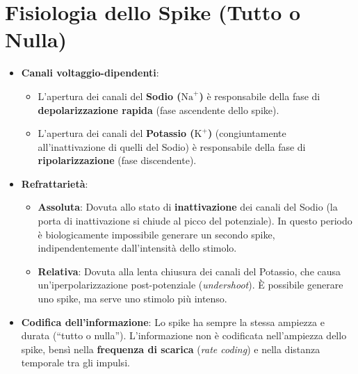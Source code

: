 \documentclass[10pt, letterpaper]{report}
\begin{document}
\section{Fisiologia dello Spike (Tutto o Nulla)}
\begin{itemize}
    \item \textbf{Canali voltaggio-dipendenti}:
    \begin{itemize}
        \item L'apertura dei canali del \textbf{Sodio (\(\text{Na}^+\))} è responsabile della fase di \textbf{depolarizzazione rapida} (fase ascendente dello spike).
        \item L'apertura dei canali del \textbf{Potassio (\(\text{K}^+\))} (congiuntamente all'inattivazione di quelli del Sodio) è responsabile della fase di \textbf{ripolarizzazione} (fase discendente).
    \end{itemize}
    \item \textbf{Refrattarietà}:
    \begin{itemize}
        \item \textbf{Assoluta}: Dovuta allo stato di \textbf{inattivazione} dei canali del Sodio (la porta di inattivazione si chiude al picco del potenziale). In questo periodo è biologicamente impossibile generare un secondo spike, indipendentemente dall'intensità dello stimolo.
        \item \textbf{Relativa}: Dovuta alla lenta chiusura dei canali del Potassio, che causa un'iperpolarizzazione post-potenziale (\emph{undershoot}). È possibile generare uno spike, ma serve uno stimolo più intenso.
    \end{itemize}
    \item \textbf{Codifica dell'informazione}: Lo spike ha sempre la stessa ampiezza e durata (``tutto o nulla''). L'informazione non è codificata nell'ampiezza dello spike, bensì nella \textbf{frequenza di scarica} (\emph{rate coding}) e nella distanza temporale tra gli impulsi.
\end{itemize}
\end{document}
